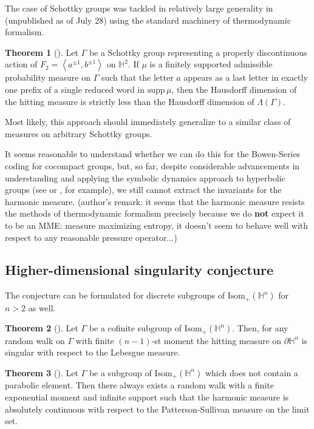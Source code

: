 \documentclass[11pt]{amsart}
\theoremstyle{definition}
\newtheorem{theorem}{Theorem}[section]
\begin{document}
	The case of Schottky groups was tackled in relatively large generality in (unpublished as of July 28)\cite{garcía2023dimension} using the standard machinery of thermodynamic formalism. 
	
	\begin{theorem}[\cite{garcía2023dimension}]
		Let $\Gamma$ be a Schottky group representing a properly discontinuous action of $F_2 = \left\langle a^{\pm 1}, b^{\pm 1} \right\rangle$ on $\mathbb{H}^2$. If $\mu$ is a finitely supported admissible probability measure on $\Gamma$ such that the letter $a$ appears as a last letter in exactly one prefix of a single reduced word in $\text{supp}\, \mu$, then the Hausdorff dimension of the hitting measure is strictly less than the Hausdorff dimension of $\Lambda(\Gamma)$.
	\end{theorem}
	Most likely, this approach should immediately generalize to a similar class of measures on arbitrary Schottky groups.
	
	It seems reasonable to understand whether we can do this for the Bowen-Series coding for cocompact groups, but, so far, despite considerable advancements in understanding and applying the symbolic dynamics approach to hyperbolic groups (see \cite{ASENS_2013_4_46_1_131_0} or \cite{cantrell2022invariant}, for example), we still cannot extract the invariants for the harmonic measure. (author's remark: it seems that the harmonic measure resists the methods of thermodynamic formalism precisely because we do \textbf{not} expect it to be an MME: measure maximizing entropy, it doesn't seem to behave well with respect to any reasonable pressure operator...)
	
	\subsection{Higher-dimensional singularity conjecture}
	The conjecture can be formulated for discrete subgroups of $\text{Isom}_+(\mathbb{H}^n)$ for $n > 2$ as well. 
	
	\begin{theorem}[\cite{2019arXiv190411581R}]
		Let $\Gamma$ be a cofinite subgroup of $\text{Isom}_+(\mathbb{H}^n)$. Then, for any random walk on $\Gamma$ with finite $(n-1)$-st moment the hitting measure on $\partial \mathbb{H}^n$ is singular with respect to the Lebesgue measure.
	\end{theorem}
	\begin{theorem}[\cite{linaudpan}]
		Let $\Gamma$ be a subgroup of $\text{Isom}_+(\mathbb{H}^n)$ which does not contain a parabolic element. Then there always exists a random walk with a finite exponential moment and infinite support such that the harmonic measure is absolutely continuous with respect to the Patterson-Sullivan measure on the limit set.
	\end{theorem}
	
\end{document}
